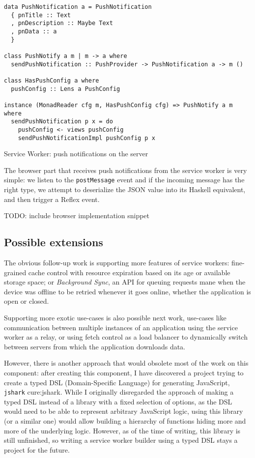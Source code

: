 \documentclass[english,odsaz]{fitthesis}
\begin{document}
\begin{listing}[htbp]
\begin{verbatim}
data PushNotification a = PushNotification
  { pnTitle :: Text
  , pnDescription :: Maybe Text
  , pnData :: a
  }

class PushNotify a m | m -> a where
  sendPushNotification :: PushProvider -> PushNotification a -> m ()

class HasPushConfig a where
  pushConfig :: Lens a PushConfig

instance (MonadReader cfg m, HasPushConfig cfg) => PushNotify a m where
  sendPushNotification p x = do
    pushConfig <- views pushConfig
    sendPushNotificationImpl pushConfig p x
\end{verbatim}
\caption{Service Worker: push notifications on the server \label{sw-server-push}}
\end{listing}

The browser part that receives push notifications from the service worker
is very simple: we listen to the \texttt{postMessage} event and if the incoming message
has the right type, we attempt to deserialize the JSON value into its Haskell
equivalent, and then trigger a Reflex event.

TODO: include browser implementation snippet

\subsection{Possible extensions}
\label{sec:org6ca0ba4}
The obvious follow-up work is supporting more features of service workers:
fine-grained cache control with resource expiration based on its age or available
storage space; or \emph{Background Sync}, an API for queuing requests mane when the device
was offline to be retried whenever it goes online, whether the application is
open or closed.

Supporting more exotic use-cases is also possible next work, use-cases like
communication between multiple instances of an application using the service
worker as a relay, or using fetch control as a load balancer to dynamically
switch between servers from which the application downloads data.

However, there is another approach that would obsolete most of the work on this
component: after creating this component, I have discovered a project trying to
create a typed DSL (Domain-Specific Language) for generating JavaScript, \texttt{jshark}
cure:jshark. While I originally disregarded the approach of making a typed DSL
instead of a library with a fixed selection of options, as the DSL would need to
be able to represent arbitrary JavaScript logic, using this library (or a
similar one) would allow building a hierarchy of functions hiding more and more
of the underlying logic. However, as of the time of writing, this library is
still unfinished, so writing a service worker builder using a typed DSL stays a
project for the future.
\end{document}
